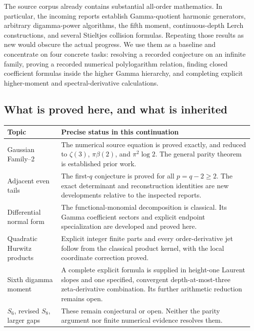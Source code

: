 \documentclass[11pt,a4paper]{article}
\numberwithin{equation}{section}
\theoremstyle{definition}
\theoremstyle{remark}
\begin{document}
The source corpus already contains substantial all-order mathematics.
In particular, the incoming reports \cite{SourceCanonical,SourceHigher} establish Gamma-quotient harmonic
generators, arbitrary digamma-power algorithms, the fifth moment,
continuous-depth Lerch constructions, and several Stieltjes collision
formulas.  Repeating those results as new would obscure the actual
progress.  We use them as a baseline and concentrate on four concrete
tasks: resolving a recorded conjecture on an infinite family, proving a
recorded numerical polylogarithm relation, finding closed coefficient
formulas inside the higher Gamma hierarchy, and completing explicit
higher-moment and spectral-derivative calculations.

\subsection{What is proved here, and what is inherited}

\begin{center}
\small
\begin{tabularx}{\textwidth}{@{}p{}X@{}}
\toprule
Topic & Precise status in this continuation \\
\midrule
Gaussian Family--2 & The numerical source equation is proved exactly,
and reduced to $\zeta(3)$, $\pi\beta(2)$, and $\pi^2\log2$.
The general parity theorem is established prior work. \\
Adjacent even tails & The first-$q$ conjecture is proved for all
$p=q-2\ge2$.  The exact determinant and reconstruction identities
are new developments relative to the inspected reports. \\
Differential normal form & The functional-monomial decomposition is
classical.  Its Gamma coefficient sectors and explicit endpoint
specialization are developed and proved here. \\
Quadratic Hurwitz products & Explicit integer finite parts and every
order-derivative jet follow from the classical product kernel, with
the local coordinate correction proved. \\
Sixth digamma moment & A complete explicit formula is supplied in
height-one Laurent slopes and one specified, convergent depth-at-most-three
zeta-derivative combination.  Its further arithmetic reduction remains open. \\
$S_6$, revised $S_8$, larger gaps & These remain conjectural or open.
Neither the parity argument nor finite numerical evidence resolves them. \\
\bottomrule
\end{tabularx}
\end{center}
\end{document}
